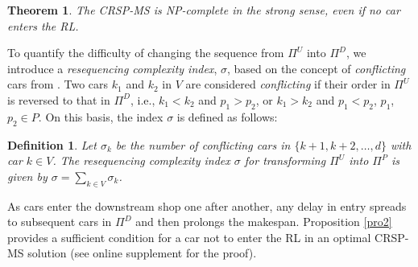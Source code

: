 \documentclass[12pt]{article}
\newtheorem{theorem}{Theorem}
\newtheorem{definition}{Definition}
\begin{document}
\begin{theorem}\label{theo1}
    The CRSP-MS is NP-complete in the strong sense, even if no car enters the RL.
\end{theorem}





To quantify the difficulty of changing the sequence from $\Pi^{U}$ into $\Pi^{D}$, we introduce a \textit{resequencing complexity index}, $\sigma$, based on the concept of \textit{conflicting} cars from \citet{guo2025logic}. Two cars $k_1$ and $k_2$ in $V$ are considered \textit{conflicting} if their order in $\Pi^{U}$ is reversed to that in $\Pi^{D}$, i.e., $k_1<k_2$ and $p_1>p_2$, or $k_1>k_2$ and $p_1<p_2$, $p_1$, $p_2\in P$. On this basis, the index $\sigma$ is defined as follows:



\begin{definition}\label{def1}
    Let $\sigma_k$ be the number of \textit{conflicting} cars in $\{k+1,k+2,\dots,d\}$ with car $k\in V$. The \textit{resequencing complexity index} $\sigma$ for transforming $\Pi^U$ into $\Pi^P$ is given by $\sigma=\sum_{k\in V}{\sigma_k}$.
\end{definition}

As cars enter the downstream shop one after another, any delay in entry spreads to subsequent cars in $\Pi^D$ and then prolongs the makespan. Proposition \ref{pro2} provides a sufficient condition for a car not to enter the RL in an optimal CRSP-MS solution (see online supplement for the proof).
\end{document}
